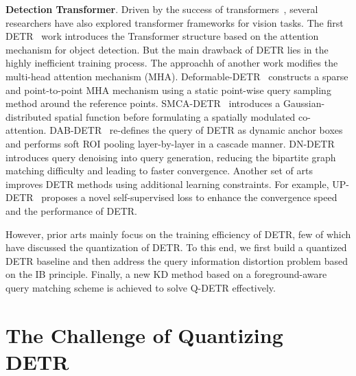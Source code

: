 \documentclass[10pt,twocolumn,letterpaper]{article}
\begin{document}
\textbf{Detection Transformer}.
%
Driven by the success of transformers~\cite{vaswani2017attention}, several researchers have also explored transformer frameworks for vision tasks. The first DETR~\cite{carion2020end} work introduces the Transformer structure based on the attention mechanism for object detection. But the main drawback of DETR lies in the  highly inefficient training process. %
The approachh of another work modifies the multi-head attention mechanism (MHA). Deformable-DETR~\cite{zhu2020deformable} constructs a sparse and point-to-point MHA mechanism using a static point-wise query sampling method around the reference points. SMCA-DETR~\cite{gao2021fast} introduces a Gaussian-distributed spatial function  before formulating a spatially modulated co-attention. DAB-DETR~\cite{liu2022dab} re-defines the query of DETR as dynamic anchor boxes and performs soft ROI pooling layer-by-layer in a cascade manner. DN-DETR~\cite{li2022dn} introduces query denoising into query generation, reducing the bipartite graph matching difficulty and leading to faster convergence. Another set of arts improves DETR methods using additional learning constraints. For example, UP-DETR~\cite{dai2021up} proposes a novel self-supervised loss to enhance the convergence speed and the performance of DETR. 


%
%
However, prior arts mainly focus on the training efficiency of DETR, few of which have discussed the quantization of DETR. 
{To this end, we first build a  quantized DETR baseline and then address the query information distortion problem   based on the IB principle. Finally, a new KD method based on a foreground-aware query matching scheme is achieved  to solve Q-DETR effectively.
}

\section{The Challenge of Quantizing DETR}
\end{document}

